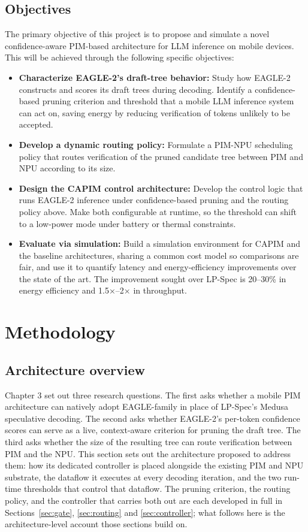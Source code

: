 \documentclass[11pt]{article}
\begin{document}
\subsection{Objectives}
\label{subsec:objectives}
The primary objective of this project is to propose and simulate a novel confidence-aware PIM-based architecture for LLM inference on mobile devices. This will be achieved through the following specific objectives:
\begin{itemize}
    \item \textbf{Characterize EAGLE-2's draft-tree behavior:} Study how EAGLE-2 constructs and scores its draft trees during decoding. Identify a confidence-based pruning criterion and threshold that a mobile LLM inference system can act on, saving energy by reducing verification of tokens unlikely to be accepted.
    \item \textbf{Develop a dynamic routing policy:} Formulate a PIM-NPU scheduling policy that routes verification of the pruned candidate tree between PIM and NPU according to its size.
    \item \textbf{Design the CAPIM control architecture:} Develop the control logic that runs EAGLE-2 inference under confidence-based pruning and the routing policy above. Make both configurable at runtime, so the threshold can shift to a low-power mode under battery or thermal constraints.
    \item \textbf{Evaluate via simulation:} Build a simulation environment for CAPIM and the baseline architectures, sharing a common cost model so comparisons are fair, and use it to quantify latency and energy-efficiency improvements over the state of the art. The improvement sought over LP-Spec is 20--30\% in energy efficiency and 1.5×--2× in throughput.
\end{itemize}


\newpage
\section{Methodology}

\subsection{Architecture overview}
\label{sec:overview}
Chapter 3 set out three research questions. The first asks whether a mobile PIM architecture can natively adopt EAGLE-family in place of LP-Spec's Medusa speculative decoding. The second asks whether EAGLE-2's per-token confidence scores can serve as a live, context-aware criterion for pruning the draft tree. The third asks whether the size of the resulting tree can route verification between PIM and the NPU. This section sets out the architecture proposed to address them: how its dedicated controller is placed alongside the existing PIM and NPU substrate, the dataflow it executes at every decoding iteration, and the two run-time thresholds that control that dataflow. The pruning criterion, the routing policy, and the controller that carries both out are each developed in full in Sections~\ref{sec:gate}, \ref{sec:routing} and \ref{sec:controller}; what follows here is the architecture-level account those sections build on.
\end{document}
